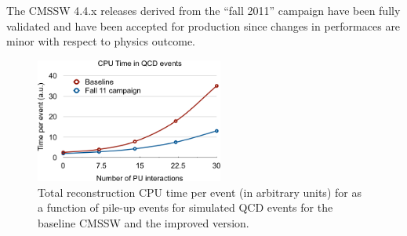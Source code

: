 The CMSSW 4.4.x releases derived from the ``fall 2011'' campaign have been
fully validated and have been accepted for production since changes in
performaces are minor with respect to physics outcome.  
\begin{figure}[t]
\includegraphics*[width=0.55\textwidth]{figs/recotime_vs_pu.png}\hspace{0.02\textwidth}%
\begin{minipage}[b]{0.38\textwidth}\caption{\label{fig:fall11vsPU}Total reconstruction CPU time per event (in arbitrary units)
  for as a function of pile-up events for simulated QCD
  events for the baseline CMSSW and the 
improved version.}
\end{minipage}
\end{figure}

